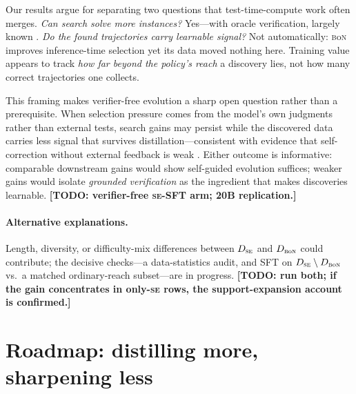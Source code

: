 \documentclass{article}
\newcommand{\todo}[1]{\textcolor{orange!75!black}{\textbf{[TODO: #1]}}}
\newcommand{\se}{\textnormal{\textsc{se}}}
\newcommand{\bon}{\textnormal{\textsc{b}o\textsc{n}}}
\begin{document}
Our results argue for separating two questions that test-time-compute work often merges. \emph{Can search solve more instances?} Yes---with oracle verification, largely known \citep{romera2024funsearch, olausson2024selfrepair}. \emph{Do the found trajectories carry learnable signal?} Not automatically: \bon{} improves inference-time selection \citep{brown2024monkeys, cobbe2021verifiers} yet its data moved nothing here. Training value appears to track \emph{how far beyond the policy's reach} a discovery lies, not how many correct trajectories one collects.

This framing makes verifier-free evolution a sharp open question rather than a prerequisite. When selection pressure comes from the model's own judgments \citep{wang2023selfconsistency} rather than external tests, search gains may persist while the discovered data carries less signal that survives distillation---consistent with evidence that self-correction without external feedback is weak \citep{huang2024cannot}. Either outcome is informative: comparable downstream gains would show self-guided evolution suffices; weaker gains would isolate \emph{grounded verification} as the ingredient that makes discoveries learnable. \todo{verifier-free \se{}-SFT arm; 20B replication.}

\paragraph{Alternative explanations.}
Length, diversity, or difficulty-mix differences between $D_{\se{}}$ and $D_{\bon{}}$ could contribute; the decisive checks---a data-statistics audit, and SFT on $D_{\se{}} \setminus D_{\bon{}}$ vs.\ a matched ordinary-reach subset---are in progress. \todo{run both; if the gain concentrates in only-\se{} rows, the support-expansion account is confirmed.}

\section{Roadmap: distilling more, sharpening less}
\label{sec:roadmap}
\end{document}
